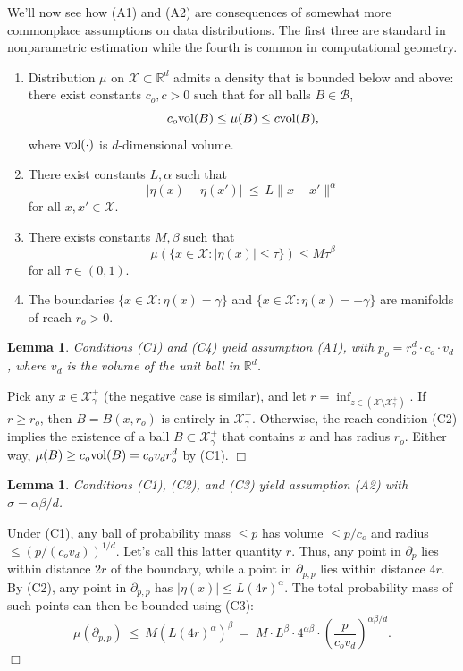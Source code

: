 \documentclass{article}
\def\R{{\mathbb{R}}}
\def\X{{\mathcal X}}
\def\B{{\mathcal B}}
\def\vol{{\rm vol}}
\newtheorem{lemma}[thm]{Lemma}
\newenvironment{proof}{\noindent {\sc Proof:}}{$\Box$ \medskip}
\begin{document}
We'll now see how (A1) and (A2) are consequences of somewhat more commonplace assumptions on data distributions. The first three are standard in nonparametric estimation while the fourth is common in computational geometry.
\begin{enumerate}
\item[(C1)] [Strong density condition] Distribution $\mu$ on $\X \subset \R^d$ admits a density that is bounded below and above: there exist constants $c_o, c > 0$ such that for all balls $B \in \B$,
$$ c_o \vol(B) \leq \mu(B) \leq c \vol(B) ,$$
where $\vol(\cdot)$ is $d$-dimensional volume.
\item[(C2)] [Holder-smoothness of conditional probability function] There exist constants $L, \alpha$ such that
$$ |\eta(x) - \eta(x')| \ \leq \ L \|x - x'\|^\alpha$$
for all $x,x' \in \X$.
\item[(C3)] [Tsybakov margin condition] There exists constants $M, \beta$ such that
$$ \mu(\{x \in \X: |\eta(x)| \leq \tau\}) \leq M \tau^\beta$$
for all $\tau \in (0,1)$.
\item[(C4)] [Bounded curvature] The boundaries $\{x \in \X: \eta(x) = \gamma\}$ and $\{x \in \X: \eta(x) = -\gamma\}$ are manifolds of reach $r_o > 0$.
\end{enumerate}

\begin{lemma}
Conditions (C1) and (C4) yield assumption (A1), with $p_o = r_o^d \cdot c_o \cdot v_d$, where $v_d$ is the volume of the unit ball in $\R^d$.
\label{lemma:A1}
\end{lemma}

\begin{proof}
Pick any $x \in \X_\gamma^+$ (the negative case is similar), and let $r = \inf_{z \in (\X \setminus \X_\gamma^+)}$. If $r \geq r_o$, then $B = B(x,r_o)$ is entirely in $\X_\gamma^+$. Otherwise, the reach condition (C2) implies the existence of a ball $B \subset \X_\gamma^+$ that contains $x$ and has radius $r_o$. Either way, $\mu(B) \geq c_o \vol(B) = c_o v_d r_o^d$ by (C1). 
\end{proof}

\begin{lemma}
Conditions (C1), (C2), and (C3) yield assumption (A2) with $\sigma = \alpha \beta/d$. 
\end{lemma}

\begin{proof}
Under (C1), any ball of probability mass $\leq p$ has volume $\leq p/c_o$ and radius $\leq (p/(c_o v_d))^{1/d}$. Let's call this latter quantity $r$. Thus, any point in $\partial_p$ lies within distance $2r$ of the boundary, while a point in $\partial_{p,p}$ lies within distance $4r$. By (C2), any point in $\partial_{p,p}$ has $|\eta(x)| \leq L (4r)^\alpha$. The total probability mass of such points can then be bounded using (C3):
$$ \mu(\partial_{p,p}) \ \leq \ M (L (4r)^\alpha)^\beta \ = \ M \cdot L^\beta \cdot 4^{\alpha\beta} \cdot \left( \frac{p}{c_o v_d} \right)^{\alpha\beta/d} .$$
\end{proof}
\end{document}
